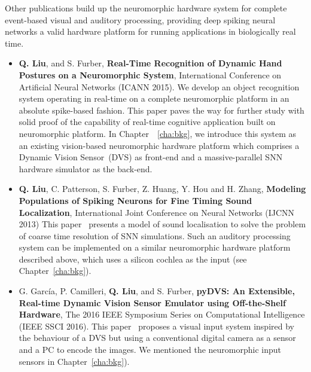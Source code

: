 	Other publications build up the neuromorphic hardware system for complete event-based visual and auditory processing, providing deep spiking neural networks a valid hardware platform for running applications in biologically real time.
\begin{itemize}
	\item 
	\textbf{Q. Liu}, and S. Furber, \textbf{Real-Time Recognition of Dynamic Hand Postures on a Neuromorphic System}, International Conference on Artificial Neural Networks (ICANN 2015).
	We develop an object recognition system operating in real-time on a complete neuromorphic platform in an absolute spike-based fashion.
	This paper paves the way for further study with solid proof of the capability of real-time cognitive application built on neuromorphic platform.
	In Chapter~~\ref{cha:bkg}, we introduce this system as an existing vision-based neuromorphic hardware platform which comprises a Dynamic Vision Sensor~(DVS) as front-end and a massive-parallel SNN hardware simulator as the back-end. 
	
	\item
	\textbf{Q. Liu}, C. Patterson, S. Furber, Z. Huang, Y. Hou and H. Zhang, \textbf{Modeling Populations of Spiking Neurons for Fine Timing Sound Localization}, International Joint Conference on Neural Networks (IJCNN 2013)
	This paper~\cite{liu2013modeling} presents a model of sound localisation to solve the problem of coarse time resolution of SNN simulations.
	Such an auditory processing system can be implemented on a similar neuromorphic hardware platform described above, which uses a silicon cochlea as the input (see Chapter~\ref{cha:bkg}).
	
	\item 
	G. Garc\'ia, P. Camilleri, \textbf{Q. Liu}, and S. Furber, \textbf{pyDVS: An Extensible, Real-time Dynamic Vision Sensor Emulator using Off-the-Shelf Hardware}, The 2016 IEEE Symposium Series on Computational Intelligence (IEEE SSCI 2016).
	This paper~\cite{7850249} proposes a visual input system inspired by the behaviour of a DVS but using a conventional digital camera as a sensor and a
	PC to encode the images.
	We mentioned the neuromorphic input sensors in Chapter~\ref{cha:bkg}).
\end{itemize}


